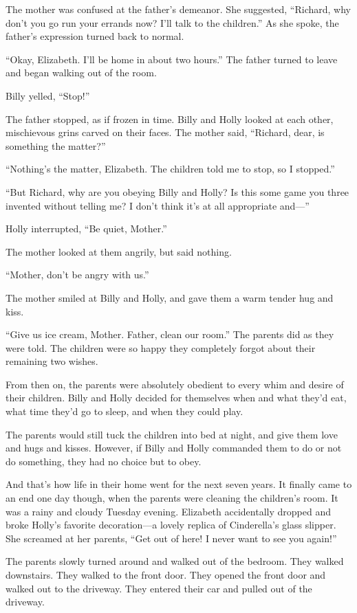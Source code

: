 The mother was confused at the father's demeanor. She suggested, “Richard, why don't you go run your errands now? I'll talk to the children.” As she spoke, the father's expression turned back to normal.

“Okay, Elizabeth. I'll be home in about two hours.” The father turned to leave and began walking out of the room.

Billy yelled, “Stop!”

The father stopped, as if frozen in time. Billy and Holly looked at each other, mischievous grins carved on their faces. The mother said, “Richard, dear, is something the matter?”

“Nothing's the matter, Elizabeth. The children told me to stop, so I stopped.”

“But Richard, why are you obeying Billy and Holly? Is this some game you three invented without telling me? I don't think it's at all appropriate and—”

Holly interrupted, “Be quiet, Mother.”

The mother looked at them angrily, but said nothing.

“Mother, don't be angry with us.”

The mother smiled at Billy and Holly, and gave them a warm tender hug and kiss.

“Give us ice cream, Mother. Father, clean our room.” The parents did as they were told. The children were so happy they completely forgot about their remaining two wishes.

From then on, the parents were absolutely obedient to every whim and desire of their children. Billy and Holly decided for themselves when and what they'd eat, what time they'd go to sleep, and when they could play.

The parents would still tuck the children into bed at night, and give them love and hugs and kisses. However, if Billy and Holly commanded them to do or not do something, they had no choice but to obey.

And that's how life in their home went for the next seven years. It finally came to an end one day though, when the parents were cleaning the children's room. It was a rainy and cloudy Tuesday evening. Elizabeth accidentally dropped and broke Holly's favorite decoration—a lovely replica of Cinderella's glass slipper. She screamed at her parents, “Get out of here! I never want to see you again!”

The parents slowly turned around and walked out of the bedroom. They walked downstairs. They walked to the front door. They opened the front door and walked out to the driveway. They entered their car and pulled out of the driveway.

